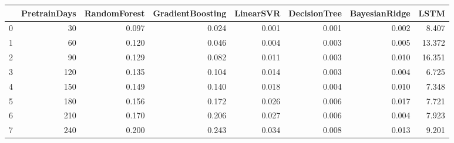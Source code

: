 \begin{tabular}{lrrrrrrr}
\toprule
{} &  PretrainDays &  RandomForest &  GradientBoosting &  LinearSVR &  DecisionTree &  BayesianRidge &   LSTM \\
\midrule
0 &            30 &         0.097 &             0.024 &      0.001 &         0.001 &          0.002 &  8.407 \\
1 &            60 &         0.120 &             0.046 &      0.004 &         0.003 &          0.005 & 13.372 \\
2 &            90 &         0.129 &             0.082 &      0.011 &         0.003 &          0.010 & 16.351 \\
3 &           120 &         0.135 &             0.104 &      0.014 &         0.003 &          0.004 &  6.725 \\
4 &           150 &         0.149 &             0.140 &      0.018 &         0.004 &          0.010 &  7.348 \\
5 &           180 &         0.156 &             0.172 &      0.026 &         0.006 &          0.017 &  7.721 \\
6 &           210 &         0.170 &             0.206 &      0.027 &         0.006 &          0.004 &  7.923 \\
7 &           240 &         0.200 &             0.243 &      0.034 &         0.008 &          0.013 &  9.201 \\
\bottomrule
\end{tabular}
